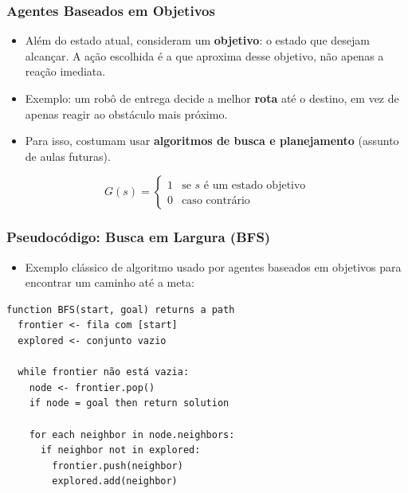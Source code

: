 \documentclass{beamer}
\begin{document}
\begin{frame}
\frametitle{Agentes Baseados em Objetivos}
\footnotesize
\begin{itemize}
    \item Além do estado atual, consideram um \textbf{objetivo}: o estado que desejam alcançar. A ação escolhida é a que aproxima desse objetivo, não apenas a reação imediata.
    \item Exemplo: um robô de entrega decide a melhor \textbf{rota} até o destino, em vez de apenas reagir ao obstáculo mais próximo.
    \item Para isso, costumam usar \textbf{algoritmos de busca e planejamento} (assunto de aulas futuras).
\end{itemize}
\[
G(s) = \begin{cases}
1 & \text{se } s \text{ é um estado objetivo} \\
0 & \text{caso contrário}
\end{cases}
\]
\begin{center}
\end{center}
\end{frame}

\begin{frame}[fragile]
\frametitle{Pseudocódigo: Busca em Largura (BFS)}
\footnotesize
\begin{itemize}
    \item Exemplo clássico de algoritmo usado por agentes baseados em objetivos para encontrar um caminho até a meta:
\end{itemize}
\begin{verbatim}
function BFS(start, goal) returns a path
  frontier <- fila com [start]
  explored <- conjunto vazio

  while frontier não está vazia:
    node <- frontier.pop()
    if node = goal then return solution

    for each neighbor in node.neighbors:
      if neighbor not in explored:
        frontier.push(neighbor)
        explored.add(neighbor)
\end{verbatim}
\end{frame}
\end{document}

